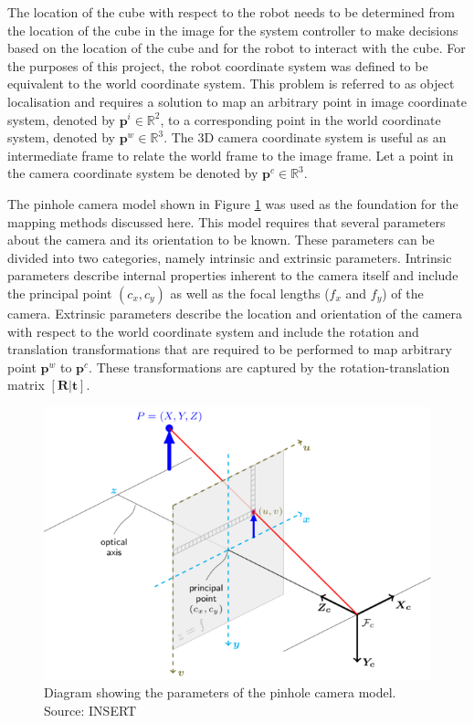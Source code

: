 The location of the cube with respect to the robot needs to be determined from the location of the cube in the image for the system controller to make decisions based on the location of the cube and for the robot to interact with the cube. For the purposes of this project, the robot coordinate system was defined to be equivalent to the world coordinate system. This problem is referred to as object localisation and requires a solution to map an arbitrary point in image coordinate system, denoted by $\boldsymbol{p}^i\in\mathbb{R}^2$, to a corresponding point in the world coordinate system, denoted by $\boldsymbol{p}^w\in\mathbb{R}^3$. The 3D camera coordinate system is useful as an intermediate frame to relate the world frame to the image frame. Let a point in the camera coordinate system be denoted by $\boldsymbol{p}^c\in\mathbb{R}^3$.


The pinhole camera model shown in Figure \ref{fig:pinhole-camera-model} was used as the foundation for the mapping methods discussed here. This model requires that several parameters about the camera and its orientation to be known. These parameters can be divided into two categories, namely intrinsic and extrinsic parameters. Intrinsic parameters describe internal properties inherent to the camera itself and include the principal point $(c_x,c_y)$ as well as the focal lengths ($f_x$ and $f_y$) of the camera. Extrinsic parameters describe the location and orientation of the camera with respect to the world coordinate system and include the rotation and translation transformations that are required to be performed to map arbitrary point $\boldsymbol{p}^w$ to $\boldsymbol{p}^c$. These transformations are captured by the rotation-translation matrix $[\textbf{R}|\textbf{t}]$.

\begin{figure}[!ht]
	\centering
	\includegraphics[width=0.7\linewidth]{figures/pinhole-camera-model.png}
	\caption{Diagram showing the parameters of the pinhole camera model. Source: INSERT}
	\label{fig:pinhole-camera-model}
\end{figure}

